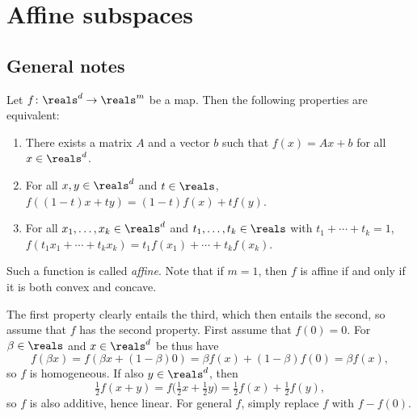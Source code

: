\documentclass[article, a4paper, 11pt, oneside]{memoir}
\title{\doctitle}
\author{\docauthor}
\numberwithin{equation}{chapter}
\theoremstyle{nonumberplain}
\begin{document}
\maketitle

\addtocounter{chapter}{1}

\chapter{Affine subspaces}

\section*{General notes}

\begin{remark}
    Let $f \colon \reals^d \to \reals^m$ be a map. Then the following properties are equivalent:
    \begin{enumerate}
        \item There exists a matrix $A$ and a vector $b$ such that $f(x) = Ax + b$ for all $x \in \reals^d$.
        
        \item For all $x,y \in \reals^d$ and $t \in \reals$, $f((1-t)x + ty) = (1-t)f(x) + tf(y)$.

        \item For all $x_1, \ldots, x_k \in \reals^d$ and $t_1, \ldots, t_k \in \reals$ with $t_1 + \cdots + t_k = 1$, $f(t_1 x_1 + \cdots + t_k x_k) = t_1 f(x_1) + \cdots + t_k f(x_k)$.
    \end{enumerate}
    Such a function is called \emph{affine}. Note that if $m = 1$, then $f$ is affine if and only if it is both convex and concave.
    
    The first property clearly entails the third, which then entails the second, so assume that $f$ has the second property. First assume that $f(0) = 0$. For $\beta \in \reals$ and $x \in \reals^d$ be thus have
    \begin{equation*}
        f(\beta x)
            = f(\beta x + (1-\beta)0)
            = \beta f(x) + (1-\beta)f(0)
            = \beta f(x),
    \end{equation*}
    so $f$ is homogeneous. If also $y \in \reals^d$, then
    \begin{equation*}
        \tfrac{1}{2} f(x + y)
            = f \bigl( \tfrac{1}{2} x + \tfrac{1}{2} y \bigr)
            = \tfrac{1}{2} f(x) + \tfrac{1}{2} f(y),
    \end{equation*}
    so $f$ is also additive, hence linear. For general $f$, simply replace $f$ with $f - f(0)$.
\end{remark}
\end{document}
